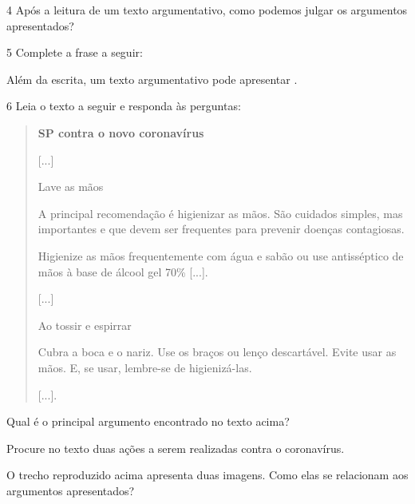 \num{4} Após a leitura de um texto argumentativo, como podemos julgar os argumentos apresentados?



\num{5} Complete a frase a seguir:

Além da escrita, um texto argumentativo pode apresentar \preencher.


\num{6} Leia o texto a seguir e responda às perguntas:

\begin{quote}
\textbf{SP contra o novo coronavírus}

{[}...{]}

Lave as mãos



A principal recomendação é higienizar as mãos. São cuidados simples,
mas importantes e que devem ser frequentes para prevenir doenças
contagiosas.

Higienize as mãos frequentemente com água e sabão ou use antisséptico de
mãos à base de álcool gel 70\% {[}...{]}.

{[}...{]}

Ao tossir e espirrar


Cubra a boca e o nariz. Use os braços ou lenço descartável. Evite usar
as mãos. E, se usar, lembre-se de higienizá-las.

{[}...{]}.

\end{quote}

\begin{escolha}
\item Qual é o principal argumento encontrado no texto acima?



\item Procure no texto duas ações a serem realizadas contra o
coronavírus.



\item O trecho reproduzido acima apresenta duas imagens. Como elas se
relacionam aos argumentos apresentados?

\end{escolha}

